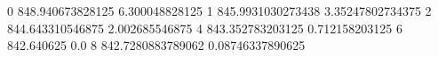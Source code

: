 0 848.940673828125 6.300048828125
1 845.9931030273438 3.35247802734375
2 844.643310546875 2.002685546875
4 843.352783203125 0.712158203125
6 842.640625 0.0
8 842.7280883789062 0.08746337890625
